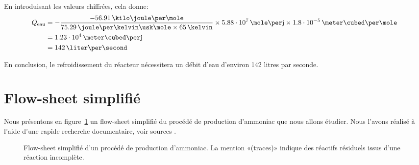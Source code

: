 En introduisant les valeurs chiffrées, cela donne:
\begin{equation}
    \begin{aligned}
        Q\ind{eau} &=
        -\frac{-56.91\,\kilo\joule\per\mole}{75.29\,\joule\per\kelvin\usk\mole
        \times 65\,\kelvin} \times 5.88\cdot10^7\,\mole\per\mbox{j}
        \times 1.8\cdot10^{-5}\,\meter\cubed\per\mole \\
        &= 1.23\cdot10^4\,\meter\cubed\per\mbox{j} \\
        &= 142\,\liter\per\second
    \end{aligned}
\end{equation}

En conclusion, le refroidissement du réacteur nécessitera un débit d'eau
d'environ 142 litres par seconde.

\section{Flow-sheet simplifié}

Nous présentons en figure~\ref{fig:flow-sheet} un flow-sheet simplifié
du procédé de production d'ammoniac que nous allons étudier.
Nous l'avons réalisé à l'aide d'une rapide recherche documentaire,
voir sources \cite{process-patent, epa, contaminants}.

\begin{figure}
    
    \caption{Flow-sheet simplifié d'un procédé de production d'ammoniac.
        La mention «(traces)» indique des
        réactifs résiduels issus d'une réaction incomplète.
    }
    \label{fig:flow-sheet}
\end{figure}
